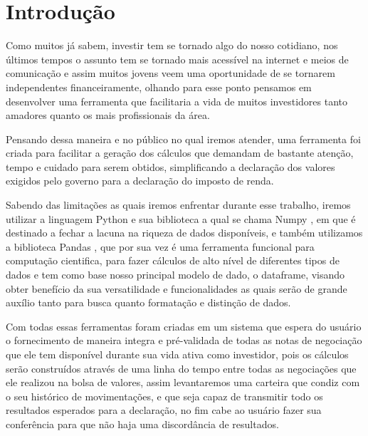 
\section{Introdução}



Como muitos já sabem, investir tem se tornado algo do nosso cotidiano, nos últimos tempos o assunto tem se tornado mais acessível na internet e meios de comunicação e assim muitos jovens veem uma oportunidade de se tornarem independentes financeiramente, olhando para esse ponto pensamos em desenvolver uma ferramenta que facilitaria a vida de muitos investidores tanto amadores quanto os mais profissionais da área.
\par Pensando dessa maneira e no público no qual iremos atender, uma ferramenta foi criada para facilitar a geração dos cálculos que demandam de bastante atenção, tempo e cuidado para serem obtidos, simplificando a declaração dos valores exigidos pelo governo para a declaração do imposto de renda.\par Sabendo das limitações as quais iremos enfrentar durante esse trabalho, iremos utilizar a linguagem Python \cite{borges2014python} e sua biblioteca a qual se chama Numpy \cite{harris2020array}, em que é destinado a fechar a lacuna na riqueza de dados disponíveis, e também utilizamos a biblioteca Pandas \cite{mckinney2015pandas}, que por sua vez é uma ferramenta funcional para computação cientifica, para fazer cálculos de alto nível de diferentes tipos de dados e tem como base nosso principal modelo de dado, o dataframe, visando obter benefício da sua versatilidade e funcionalidades as quais serão de grande auxílio tanto para busca quanto formatação e distinção de dados.
\par Com todas essas ferramentas foram criadas em um sistema que espera do usuário o fornecimento de maneira integra e pré-validada de todas as notas de negociação que ele tem disponível durante sua vida ativa como investidor, pois os cálculos serão construídos através de uma linha do tempo entre todas as negociações que ele realizou na bolsa de valores, assim levantaremos uma carteira que condiz com o seu histórico de movimentações, e que seja capaz de transmitir todo os resultados esperados para a declaração, no fim cabe ao usuário fazer sua conferência para que não haja uma discordância de resultados.

